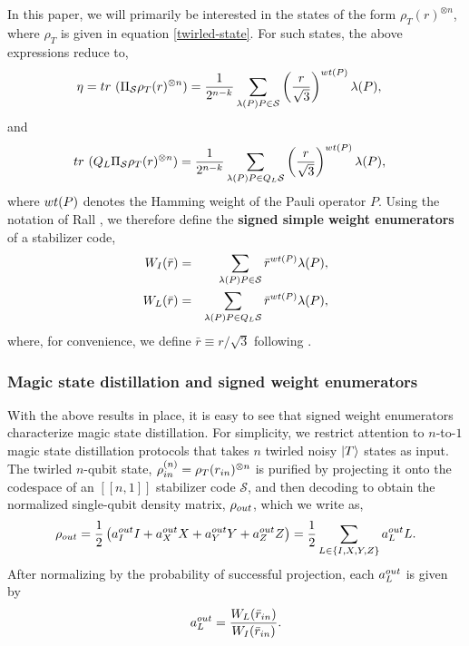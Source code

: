 \documentclass[11pt]{article}
\def\ket#1{\mathinner{|{#1}\rangle}}
\newcommand{\wt}{{\rm{wt}} }
\newcommand{\tr}{{\rm{tr~}}}
\begin{document}
In this paper, we will primarily be interested in the states of the form $\rho_{T}(r)^{\otimes n}$, where $\rho_{T}$ is given in equation \eqref{twirled-state}.
For such states, the above expressions reduce to,
\begin{equation}
\begin{split}
    \eta = \tr (\Pi_{\mathcal S}\rho_{T}(r)^{\otimes n}) & = \frac{1}{2^{n-k}} \sum_{\lambda(P) P \in {\mathcal S}} \left(\frac{r}{\sqrt{3}}\right)^{\wt(P)} \lambda(P),
\end{split}
\end{equation}
and 
\begin{equation}
\begin{split}
    \tr (Q_L \Pi_{\mathcal S}\rho_{T}(r)^{\otimes n}) & = \frac{1}{2^{n-k}} \sum_{\lambda(P) P \in {Q_L \mathcal S}} \left(\frac{r}{\sqrt{3}}\right)^{\wt(P)} \lambda(P),
\end{split}
\end{equation}
where $\wt(P)$ denotes the Hamming weight of the Pauli operator $P$.
Using the notation of Rall \cite{rall2017signed}, we therefore define the \textbf{signed simple weight enumerators} of a stabilizer code, 
\begin{eqnarray}
    W_I(\bar{r}) & = & \sum_{\lambda(P) P \in {\mathcal S}} {\bar{r}}^{\wt(P)} \lambda(P), \\
    W_{L}(\bar{r}) & = & \sum_{\lambda(P) P \in {Q_L \mathcal S}} \bar{r}^{\wt(P)} \lambda(P), \label{signed-logical-swe}
\end{eqnarray}
where, for convenience, we define $\bar{r} \equiv r/\sqrt{3}$ following \cite{rall2017signed}.

\subsubsection*{Magic state distillation and signed weight enumerators}

With the above results in place, it is easy to see that signed weight enumerators characterize magic state distillation. For simplicity, we restrict attention to $n$-to-$1$ magic state distillation protocols that takes $n$ twirled noisy $\ket{T}$ states as input. The twirled $n$-qubit state, $\rho^{(n)}_{\rm in}=\rho_T(r_{\rm in})^{\otimes n}$ is purified by projecting it onto the codespace of an $[[n,1]]$ stabilizer code $\mathcal{S}$, and then decoding to obtain the normalized single-qubit density matrix, $\rho_{\rm out}$, which we write as,
\begin{equation}
    \rho_{\rm out}= \frac{1}{2} \left( {a}^{\rm out}_{I} I + {a}^{\rm out}_{X} X+ {a}^{\rm out}_{Y}Y + {a}^{\rm out}_{Z} Z\right) = \frac{1}{2}\sum_{L \in \{I,X,Y,Z\}} {a}^{\rm out}_L L.
\end{equation}
After normalizing by the probability of successful projection, each $a_L^{\rm out}$ is given by
\begin{equation}
    {a}_L^{\rm out} = \frac{W_L(\bar{r}_{\rm in})}{W_I(\bar{r}_{\rm in})}.
\end{equation}
 
\end{document}
